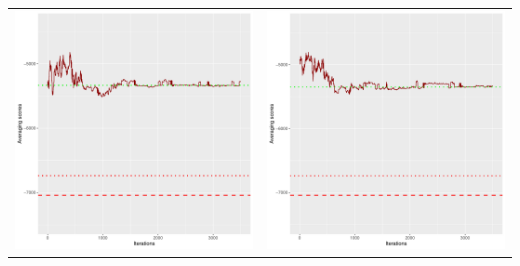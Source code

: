 \documentclass[]{scrartcl}
\begin{document}
\begin{table}[h!]
\begin{tabular}{cc}
\includegraphics[scale = 0.4]{./figs/alarm/v2/30/avgBoundsEvolution-3502.pdf} & 
\includegraphics[scale = 0.4]{./figs/alarm/v2/50/avgBoundsEvolution-3502.pdf} \\

\end{tabular}
\end{table}
\end{document}
